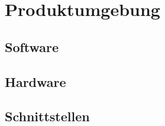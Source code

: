 \section{Produktumgebung}
\subsection{Software}
    \begin{itemize}
    \end{itemize}
\subsection{Hardware}
    \begin{itemize}
    \end{itemize}
\subsection{Schnittstellen}
    \begin{itemize}
    \end{itemize}
\newpage